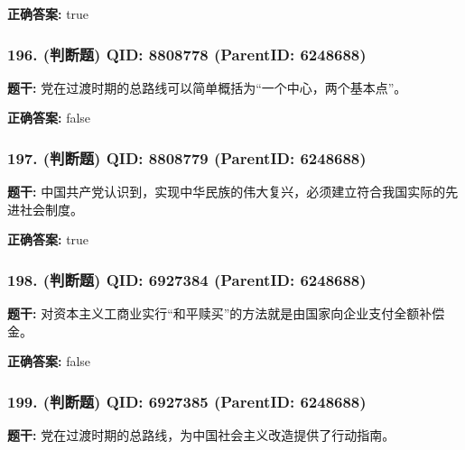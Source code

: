 \documentclass[12pt,UTF8]{ctexart}
\begin{document}
\textbf{正确答案:}
true

\vspace{0.3em}\hrulefill\vspace{0.7em}

\subsubsection*{196. (判断题) \small QID: 8808778 (ParentID: 6248688)}

\textbf{题干:}
党在过渡时期的总路线可以简单概括为“一个中心，两个基本点”。



\textbf{正确答案:}
false

\vspace{0.3em}\hrulefill\vspace{0.7em}

\subsubsection*{197. (判断题) \small QID: 8808779 (ParentID: 6248688)}

\textbf{题干:}
中国共产党认识到，实现中华民族的伟大复兴，必须建立符合我国实际的先进社会制度。



\textbf{正确答案:}
true

\vspace{0.3em}\hrulefill\vspace{0.7em}

\subsubsection*{198. (判断题) \small QID: 6927384 (ParentID: 6248688)}

\textbf{题干:}
对资本主义工商业实行“和平赎买”的方法就是由国家向企业支付全额补偿金。



\textbf{正确答案:}
false

\vspace{0.3em}\hrulefill\vspace{0.7em}

\subsubsection*{199. (判断题) \small QID: 6927385 (ParentID: 6248688)}

\textbf{题干:}
党在过渡时期的总路线，为中国社会主义改造提供了行动指南。
\end{document}
